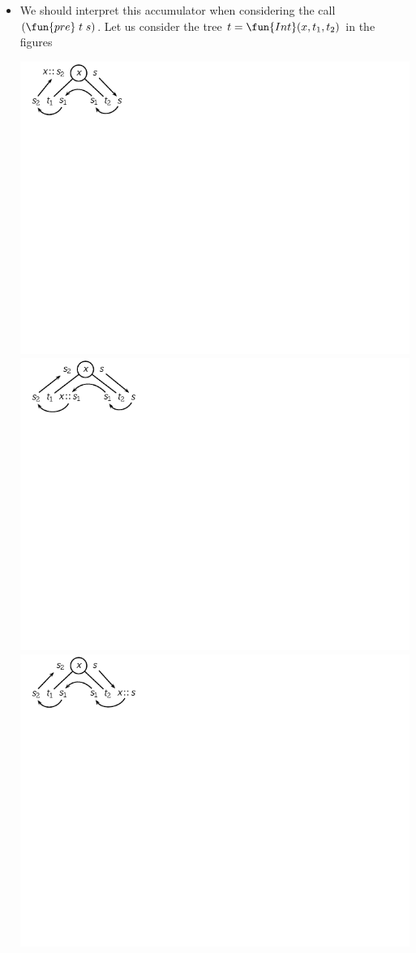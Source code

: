 \documentclass[wide]{slides}
\begin{document}
\begin{slide}
\begin{itemize}
    \item We should interpret this accumulator when considering the
      call \((\fun{pre} \; t \; s)\). Let us consider the tree \(t =
      \fun{Int} (x, t_1, t_2)\) in the figures
      \begin{center}
        \includegraphics[trim=0 75mm 75mm -2,scale=0.9]{pre_tree.pdf}
        \includegraphics[trim=1cm 75mm 75mm -2,scale=0.9]{in_tree.pdf}
        \includegraphics[trim=1cm 75mm 75mm -2,scale=0.9]{post_tree.pdf}

\end{center}
\end{itemize}
\end{slide}
\end{document}
